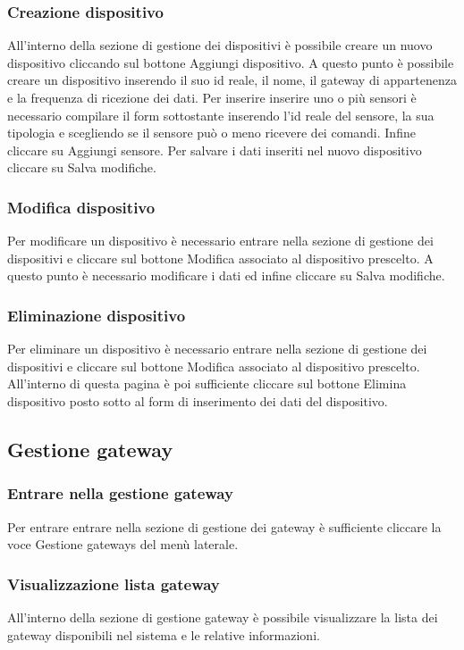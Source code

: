 	\subsubsection{Creazione dispositivo}
		All'interno della sezione di gestione dei dispositivi è possibile creare un nuovo dispositivo cliccando sul bottone Aggiungi dispositivo. A questo punto è possibile creare un dispositivo inserendo il suo id reale, il nome, il gateway di appartenenza e la frequenza di ricezione dei dati. Per inserire inserire uno o più sensori è necessario compilare il form sottostante inserendo l'id reale del sensore, la sua tipologia e scegliendo se il sensore può o meno ricevere dei comandi. Infine cliccare su Aggiungi sensore.
		Per salvare i dati inseriti nel nuovo dispositivo cliccare su Salva modifiche.

	\subsubsection{Modifica dispositivo}
		Per modificare un dispositivo è necessario entrare nella sezione di gestione dei dispositivi e cliccare sul bottone Modifica associato al dispositivo prescelto.
		A questo punto è necessario modificare i dati ed infine cliccare su Salva modifiche. 

	\subsubsection{Eliminazione dispositivo}	
		Per eliminare un dispositivo è necessario entrare nella sezione di gestione dei dispositivi e cliccare sul bottone Modifica associato al dispositivo prescelto. All'interno di questa pagina è poi sufficiente cliccare sul bottone Elimina dispositivo posto sotto al form di inserimento dei dati del dispositivo.

\subsection{Gestione gateway}

	\subsubsection{Entrare nella gestione gateway}
		Per entrare entrare nella sezione di gestione dei gateway è sufficiente cliccare la voce Gestione gateways del menù laterale.

	\subsubsection{Visualizzazione lista gateway}
		All'interno della sezione di gestione gateway è possibile visualizzare la lista dei gateway disponibili nel sistema e le relative informazioni.

